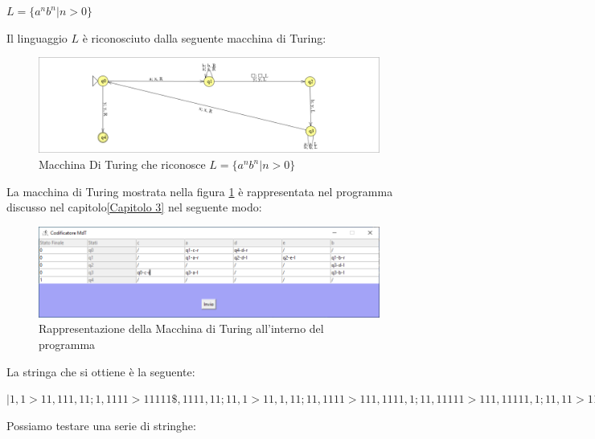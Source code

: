 \documentclass[a4paper,12pt,titlepage,oneside]{book}
\begin{document}
\begin{center}
	$L = \{a^n b^n | n > 0\}$
\end{center}

Il linguaggio $L$ è riconosciuto dalla seguente macchina di Turing:

\begin{figure}[!ht]
	\centering
	\includegraphics[width=.8\textwidth]{Images/mdt_linguaggio_2.png}
	\caption{Macchina Di Turing che riconosce $L = \{a^n b^n | n > 0\}$}
	\label{fig:mdt_linguaggio_2}
\end{figure}

La macchina di Turing mostrata nella figura \ref{fig:mdt_linguaggio_2} è rappresentata nel programma discusso nel capitolo\ref{Capitolo 3} nel seguente modo:

\begin{figure}[!ht]
	\centering
	\includegraphics[width=.8\textwidth]{Images/mdt_linguaggio_2_programma.png}
	\caption{Rappresentazione della Macchina di Turing all'interno del programma}
	\label{fig:mdt_linguaggio_2_programma}
\end{figure}

La stringa che si ottiene è la seguente:

\begin{center}
	$|1,1>11,111,11;1,1111>11111\$,1111,11;11,1>11,1,11;11,1111>111,1111,1;11,11111>111,11111,1;11,11>11,11,11;111,11>1111,1111,1;1111,111>1,111,11;1111,1>1111,1,1;1111,11>1111,11,1;$
\end{center}

Possiamo testare una serie di stringhe:
\end{document}
